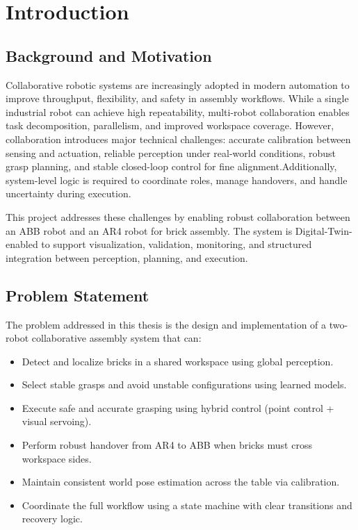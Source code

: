 \documentclass[15pt, a4paper]{extreport}
\begin{document}
\tableofcontents
\newpage
\listoffigures
\listoftables
\newpage


\chapter{Introduction}

\section{Background and Motivation}

Collaborative robotic systems are increasingly adopted in modern automation to improve throughput, flexibility, and safety in assembly workflows. While a single industrial robot can achieve high repeatability, multi-robot collaboration enables task decomposition, parallelism, and improved workspace coverage. However, collaboration introduces major technical challenges: accurate calibration between sensing and actuation, reliable perception under real-world conditions, robust grasp planning, and stable closed-loop control for fine alignment.Additionally, system-level logic is required to coordinate roles, manage handovers, and handle uncertainty during execution.

This project addresses these challenges by enabling robust collaboration between an ABB robot and an AR4 robot for brick assembly. The system is Digital-Twin-enabled to support visualization, validation, monitoring, and structured integration between perception, planning, and execution.
\section{Problem Statement}
The problem addressed in this thesis is the design and implementation of a two-robot collaborative assembly system that can:
\begin{itemize}
    \item Detect and localize bricks in a shared workspace using global perception.
    \item Select stable grasps and avoid unstable configurations using learned models.
    \item Execute safe and accurate grasping using hybrid control (point control + visual servoing).
    \item Perform robust handover from AR4 to ABB when bricks must cross workspace sides.
    \item Maintain consistent world pose estimation across the table via calibration.
    \item Coordinate the full workflow using a state machine with clear transitions and recovery logic.
\end{itemize}
\end{document}
